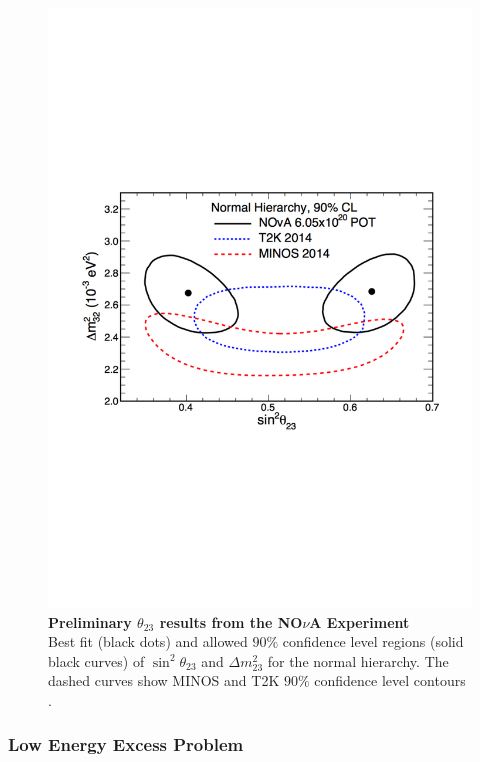 \begin{figure}
	\begin{center}
		\includegraphics[scale=0.7]{Figures/nova_result.pdf}
		\caption[Preliminary $\theta_{23}$ results from the NO$\nu$A Experiment]{ {\textbf{Preliminary $\theta_{23}$ results from the NO$\nu$A Experiment}} \\ Best fit (black dots) and allowed $90\%$ confidence level regions (solid black curves) of $\sin^2 \theta_{23}$ and $\Delta m^2_{23}$ for the normal hierarchy. The dashed curves show MINOS \cite{MINOS} and T2K \cite{T2K} $90\%$ confidence level contours \cite{NOVA}.}
		\label{nova_result}	
	\end{center}
\end{figure} 


\subsubsection{Low Energy Excess Problem}



